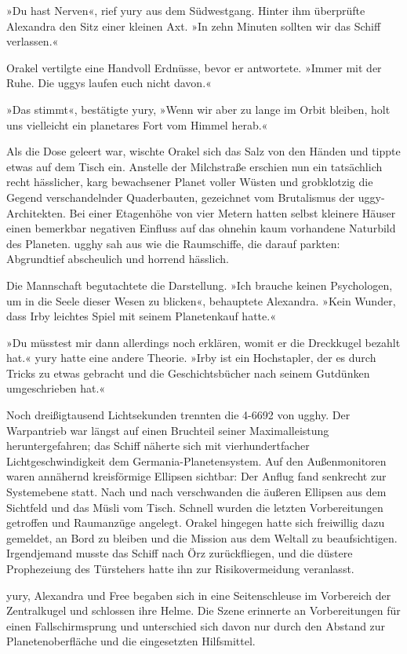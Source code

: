 »Du hast Nerven«, rief yury aus dem Südwestgang. Hinter ihm überprüfte Alexandra den Sitz einer kleinen Axt. »In zehn Minuten sollten wir das Schiff verlassen.«

Orakel vertilgte eine Handvoll Erdnüsse, bevor er antwortete. »Immer mit der Ruhe. Die uggys laufen euch nicht davon.«

»Das stimmt«, bestätigte yury, »Wenn wir aber zu lange im Orbit bleiben, holt uns vielleicht ein planetares Fort vom Himmel herab.«

Als die Dose geleert war, wischte Orakel sich das Salz von den Händen und tippte etwas auf dem Tisch ein. Anstelle der Milchstraße erschien nun ein tatsächlich recht hässlicher, karg bewachsener Planet voller Wüsten und grobklotzig die Gegend verschandelnder Quaderbauten, gezeichnet vom Brutalismus der uggy-Architekten. Bei einer Etagenhöhe von vier Metern hatten selbst kleinere Häuser einen bemerkbar negativen Einfluss auf das ohnehin kaum vorhandene Naturbild des Planeten. ugghy sah aus wie die Raumschiffe, die darauf parkten: Abgrundtief abscheulich und horrend hässlich.

Die Mannschaft begutachtete die Darstellung. »Ich brauche keinen Psychologen, um in die Seele dieser Wesen zu blicken«, behauptete Alexandra. »Kein Wunder, dass Irby leichtes Spiel mit seinem Planetenkauf hatte.«

»Du müsstest mir dann allerdings noch erklären, womit er die Dreckkugel bezahlt hat.« yury hatte eine andere Theorie. »Irby ist ein Hochstapler, der es durch Tricks zu etwas gebracht und die Geschichtsbücher nach seinem Gutdünken umgeschrieben hat.«

Noch dreißigtausend Lichtsekunden trennten die 4-6692 von ugghy. Der Warpantrieb war längst auf einen Bruchteil seiner Maximalleistung heruntergefahren; das Schiff näherte sich mit vierhundertfacher Lichtgeschwindigkeit dem Germania-Planetensystem. Auf den Außenmonitoren waren annähernd kreisförmige Ellipsen sichtbar: Der Anflug fand senkrecht zur Systemebene statt. Nach und nach verschwanden die äußeren Ellipsen aus dem Sichtfeld und das Müsli vom Tisch. Schnell wurden die letzten Vorbereitungen getroffen und Raumanzüge angelegt. Orakel hingegen hatte sich freiwillig dazu gemeldet, an Bord zu bleiben und die Mission aus dem Weltall zu beaufsichtigen. Irgendjemand musste das Schiff nach Örz zurückfliegen, und die düstere Prophezeiung des Türstehers hatte ihn zur Risikovermeidung veranlasst.

yury, Alexandra und Free begaben sich in eine Seitenschleuse im Vorbereich der Zentralkugel und schlossen ihre Helme. Die Szene erinnerte an Vorbereitungen für einen Fallschirmsprung und unterschied sich davon nur durch den Abstand zur Planetenoberfläche und die eingesetzten Hilfsmittel.

